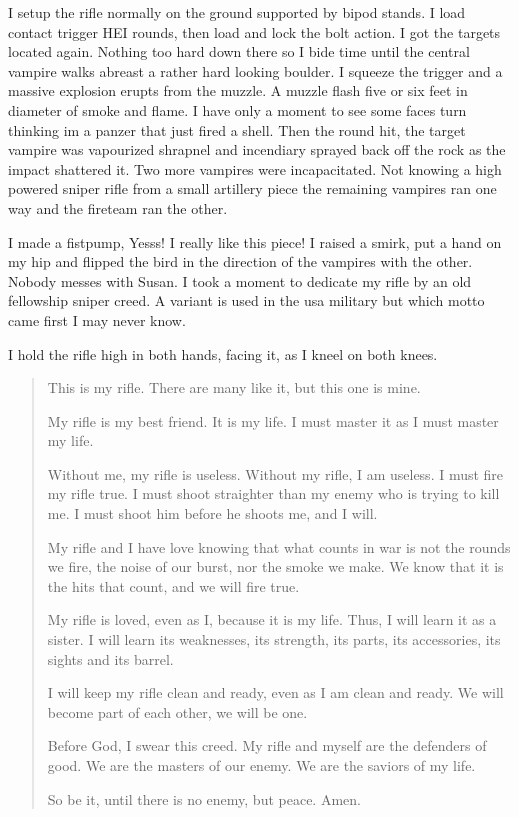 I setup the rifle normally on the ground supported by bipod stands. I load contact trigger HEI rounds, then load and lock the bolt action. I got the targets located again. Nothing too hard down there so I bide time until the central vampire walks abreast a rather hard looking boulder. I squeeze the trigger and a massive explosion erupts from the muzzle. A muzzle flash five or six feet in diameter of smoke and flame. I have only a moment to see some faces turn thinking im a panzer that just fired a shell. Then the round hit, the target vampire was vapourized shrapnel and incendiary
 sprayed back off the rock as the impact shattered it. Two more vampires were incapacitated. Not knowing a high powered sniper rifle from a small artillery piece the remaining vampires ran one way and the fireteam ran the other.

I made a fistpump, Yesss! I really like this piece! I raised a smirk, put a hand on my hip and flipped the bird in the direction of the vampires with the other. Nobody messes with Susan. I took a moment to dedicate my rifle by an old fellowship sniper creed. A variant is used in the usa military but which motto came first I may never know.

I hold the rifle high in both hands, facing it, as I kneel on both knees.

\begin{quote}
This is my rifle. 
There are many like it, but this one is mine.

My rifle is my best friend. It is my life. 
I must master it as I must master my life.

Without me, my rifle is useless. Without my rifle, I am useless. 
I must fire my rifle true. 
I must shoot straighter than my enemy who is trying to kill me. 
I must shoot him before he shoots me, and I will.

My rifle and I have love knowing that what counts in war is not the rounds we fire, 
the noise of our burst, nor the smoke we make. We know that it is the hits that count, and we will fire true.

My rifle is loved, even as I, because it is my life. 
Thus, I will learn it as a sister. 
I will learn its weaknesses, its strength, 
 its parts, its accessories, its sights and its barrel.

I will keep my rifle clean and ready, even as I am clean and ready. 
We will become part of each other, we will be one.

Before God, I swear this creed. 
My rifle and myself are the defenders of good. 
We are the masters of our enemy. We are the saviors of my life.

So be it, until there is no enemy, but peace. Amen.
\end{quote}

